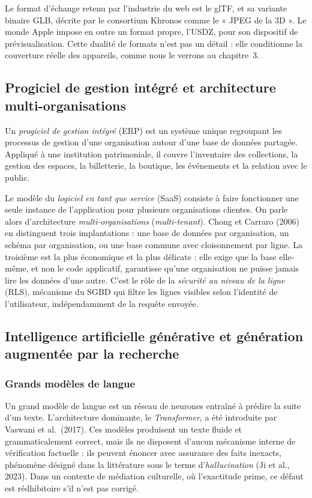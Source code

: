 Le format d'échange retenu par l'industrie du web est le glTF, et sa variante
binaire GLB, décrite par le consortium Khronos comme le « JPEG de la 3D ». Le
monde Apple impose en outre un format propre, l'USDZ, pour son dispositif de
prévisualisation. Cette dualité de formats n'est pas un détail : elle conditionne
la couverture réelle des appareils, comme nous le verrons au chapitre~3.

\subsection{Progiciel de gestion intégré et architecture multi-organisations}

Un \emph{progiciel de gestion intégré} (ERP) est un système unique regroupant
les processus de gestion d'une organisation autour d'une base de données
partagée. Appliqué à une institution patrimoniale, il couvre l'inventaire des
collections, la gestion des espaces, la billetterie, la boutique, les événements
et la relation avec le public.

Le modèle du \emph{logiciel en tant que service} (SaaS) consiste à faire
fonctionner une seule instance de l'application pour plusieurs organisations
clientes. On parle alors d'architecture \emph{multi-organisations}
(\emph{multi-tenant}). Chong et Carraro (2006) en distinguent trois
implantations : une base de données par organisation, un schéma par organisation,
ou une base commune avec cloisonnement par ligne. La troisième est la plus
économique et la plus délicate : elle exige que la base elle-même, et non le
code applicatif, garantisse qu'une organisation ne puisse jamais lire les
données d'une autre. C'est le rôle de la \emph{sécurité au niveau de la ligne}
(RLS), mécanisme du SGBD qui filtre les lignes visibles selon l'identité de
l'utilisateur, indépendamment de la requête envoyée.

\subsection{Intelligence artificielle générative et génération augmentée par la recherche}

\subsubsection{Grands modèles de langue}

Un grand modèle de langue est un réseau de neurones entraîné à prédire la suite
d'un texte. L'architecture dominante, le \emph{Transformer}, a été introduite par
Vaswani et al.\ (2017). Ces modèles produisent un texte fluide et
grammaticalement correct, mais ils ne disposent d'aucun mécanisme interne de
vérification factuelle : ils peuvent énoncer avec assurance des faits inexacts,
phénomène désigné dans la littérature sous le terme d'\emph{hallucination}
(Ji et al., 2023). Dans un contexte de médiation culturelle, où l'exactitude
prime, ce défaut est rédhibitoire s'il n'est pas corrigé.

